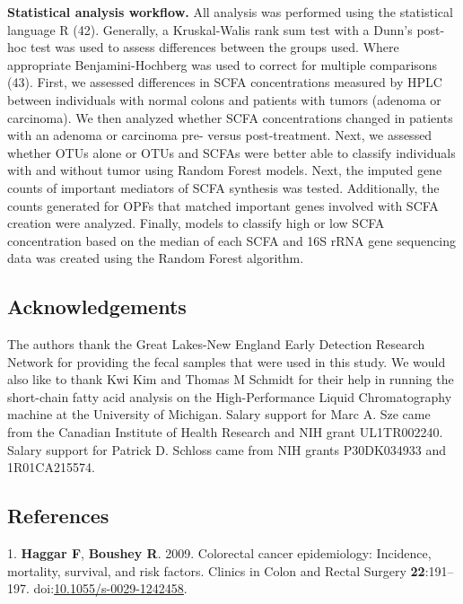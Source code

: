 \documentclass[11pt,]{article}
\begin{document}
\textbf{Statistical analysis workflow.} All analysis was performed using
the statistical language R (42). Generally, a Kruskal-Walis rank sum
test with a Dunn's post-hoc test was used to assess differences between
the groups used. Where appropriate Benjamini-Hochberg was used to
correct for multiple comparisons (43). First, we assessed differences in
SCFA concentrations measured by HPLC between individuals with normal
colons and patients with tumors (adenoma or carcinoma). We then analyzed
whether SCFA concentrations changed in patients with an adenoma or
carcinoma pre- versus post-treatment. Next, we assessed whether OTUs
alone or OTUs and SCFAs were better able to classify individuals with
and without tumor using Random Forest models. Next, the imputed gene
counts of important mediators of SCFA synthesis was tested.
Additionally, the counts generated for OPFs that matched important genes
involved with SCFA creation were analyzed. Finally, models to classify
high or low SCFA concentration based on the median of each SCFA and 16S
rRNA gene sequencing data was created using the Random Forest algorithm.

\newpage

\subsection{Acknowledgements}\label{acknowledgements}

The authors thank the Great Lakes-New England Early Detection Research
Network for providing the fecal samples that were used in this study. We
would also like to thank Kwi Kim and Thomas M Schmidt for their help in
running the short-chain fatty acid analysis on the High-Performance
Liquid Chromatography machine at the University of Michigan. Salary
support for Marc A. Sze came from the Canadian Institute of Health
Research and NIH grant UL1TR002240. Salary support for Patrick D.
Schloss came from NIH grants P30DK034933 and 1R01CA215574.

\newpage

\subsection{References}\label{references}

\hypertarget{refs}{}
\hypertarget{ref-Haggar2009}{}
1. \textbf{Haggar F}, \textbf{Boushey R}. 2009. Colorectal cancer
epidemiology: Incidence, mortality, survival, and risk factors. Clinics
in Colon and Rectal Surgery \textbf{22}:191--197.
doi:\href{https://doi.org/10.1055/s-0029-1242458}{10.1055/s-0029-1242458}.
\end{document}
